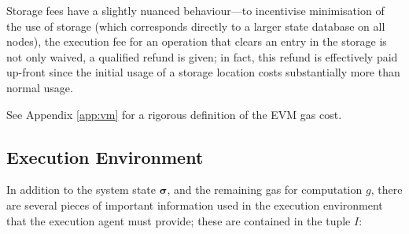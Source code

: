 \documentclass[9pt,oneside]{amsart}
\makeatletter
\newcommand{\linkdest}[1]{\Hy@raisedlink{\hypertarget{#1}{}}}
\makeatother
\begin{document}
\begin{multicols}{2}
Storage fees have a slightly nuanced behaviour---to incentivise minimisation of the use of storage (which corresponds directly to a larger state database on all nodes), the execution fee for an operation that clears an entry in the storage is not only waived, a qualified refund is given; in fact, this refund is effectively paid up-front since the initial usage of a storage location costs substantially more than normal usage.

See Appendix \ref{app:vm} for a rigorous definition of the EVM gas cost.

\subsection{Execution Environment}\linkdest{exec_env}

In addition to the system state $\boldsymbol{\sigma}$, and the remaining gas for computation $g$, there are several pieces of important information used in the execution environment that the execution agent must provide; these are contained in the tuple $I$:


\end{multicols}
\end{document}
